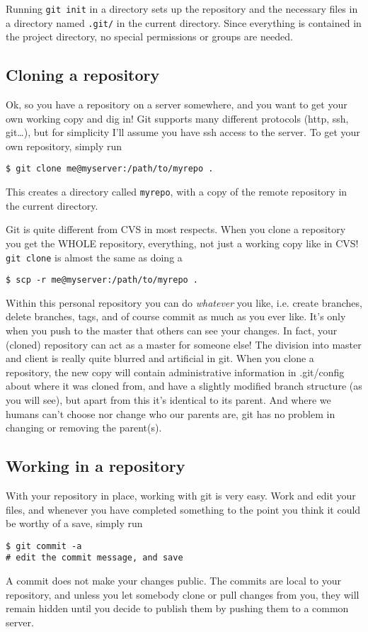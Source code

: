 \documentclass[a4paper,10pt]{article}
\begin{document}
Running \texttt{git init} in a directory sets up the repository and the
necessary files in a directory named \texttt{.git/} in the current directory.
Since everything is contained in the project directory, no special permissions
or groups are needed. 

\subsection{Cloning a repository}
Ok, so you have a repository on a server somewhere, and you want to get your own
working copy and dig in! Git supports many different protocols (http, ssh,
git\ldots), but for simplicity I'll assume you have ssh access to the server.
To get your own repository, simply run
\begin{verbatim}
$ git clone me@myserver:/path/to/myrepo .
\end{verbatim}
This creates a directory called \texttt{myrepo}, with a copy of the remote
repository in the current directory.

Git is quite different from CVS in most respects. When you clone a repository
you get the WHOLE repository, everything, not just a working copy like in CVS!
\texttt{git clone} is almost the same as doing a
\begin{verbatim}
$ scp -r me@myserver:/path/to/myrepo .
\end{verbatim}
Within this personal repository you can do \textit{whatever} you like, i.e.
create branches, delete branches, tags, and of course commit as much as you
ever like. It's only when you push to the master that others can see your
changes.  In fact, your (cloned) repository can act as a master for someone
else! The division into master and client is really quite blurred and
artificial in git.  When you clone a repository, the new copy will contain
administrative information in .git/config about where it was cloned from, and
have a slightly modified branch structure (as you will see), but apart from
this it's identical to its parent. And where we humans can't choose nor
change who our parents are, git has no problem in changing or removing the
parent(s).

\subsection{Working in a repository}
With your repository in place, working with git is very easy. Work and edit
your files, and whenever you have completed something to the point you think
it could be worthy of a save, simply run
\begin{verbatim}
$ git commit -a
# edit the commit message, and save
\end{verbatim}
A commit does not make your changes public. The commits are local to your
repository, and unless you let somebody clone or pull changes from you,
they will remain hidden until you decide to publish them by pushing them
to a common server.
\end{document}
